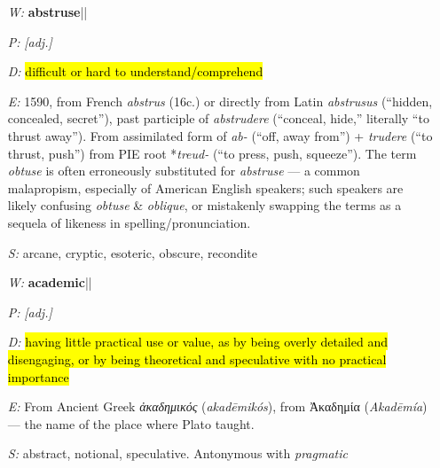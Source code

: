 \documentclass[11pt, table, dvipsnames, svgnames, x11names, xcdraw, titlepage]{article}
\begin{document}
\begin{itemize}[itemsep=0pt, topsep=0pt]
\item[\textit{W:}] \textbf{abstruse}\quad || \quad {}
\item[\textit{P:}] \textit{[adj.]}
\item[\textit{D:}] \hl{difficult or hard to understand/comprehend}
\item[\textit{E:}] 1590, from French \textit{abstrus} (16c.) or directly from Latin \textit{abstrusus} (``hidden, concealed, secret''), past participle of \textit{abstrudere} (``conceal, hide,'' literally ``to thrust away''). From assimilated form of \textit{ab-} (``off, away from'') + \textit{trudere} (``to thrust, push'') from PIE root *\textit{treud-} (``to press, push, squeeze''). The term \textit{obtuse} is often erroneously substituted for \textit{abstruse} — a common malapropism, especially of American English speakers; such speakers are likely confusing \textit{obtuse} \& \textit{oblique}, or mistakenly swapping the terms as a sequela of likeness in spelling/pronunciation.
\item[\textit{S:}] arcane, cryptic, esoteric, obscure, recondite
\end{itemize}

\null

\begin{itemize}[itemsep=0pt, topsep=0pt]
\item[\textit{W:}] \textbf{academic}\quad || \quad {}
\item[\textit{P:}] \textit{[adj.]}
\item[\textit{D:}] \hl{having little practical use or value, as by being overly detailed and disengaging, or by being theoretical and speculative with no practical importance}
\item[\textit{E:}] From Ancient Greek \textit{ἀκαδημικός} (\textit{akad\={e}mik\'{o}s}), from Ἀκαδημία (\textit{Akad\={e}m\'{i}a}) — the name of the place where Plato taught.
\item[\textit{S:}] abstract, notional, speculative. Antonymous with \textit{pragmatic}
\end{itemize}

\null
\end{document}
